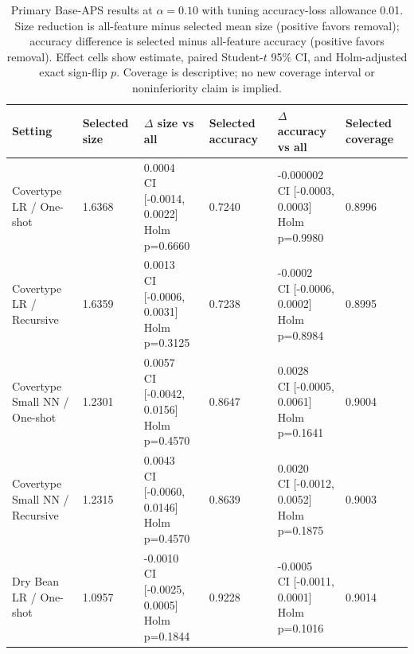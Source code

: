\begin{table}[t]
\centering
\caption{Primary Base-APS results at $\alpha=0.10$ with tuning accuracy-loss allowance 0.01. Size reduction is all-feature minus selected mean size (positive favors removal); accuracy difference is selected minus all-feature accuracy (positive favors removal). Effect cells show estimate, paired Student-$t$ 95\% CI, and Holm-adjusted exact sign-flip $p$. Coverage is descriptive; no new coverage interval or noninferiority claim is implied.}
\label{tab:t2-primary-compact}
\scriptsize
\begin{tabular}{llllll}
\hline
Setting & Selected size & $\Delta$ size vs all & Selected accuracy & $\Delta$ accuracy vs all & Selected coverage \\
\hline
\shortstack{Covertype\\LR / One-shot} & 1.6368 & \shortstack{0.0004\\CI [-0.0014, 0.0022]\\Holm p=0.6660} & 0.7240 & \shortstack{-0.000002\\CI [-0.0003, 0.0003]\\Holm p=0.9980} & 0.8996 \\
\shortstack{Covertype\\LR / Recursive} & 1.6359 & \shortstack{0.0013\\CI [-0.0006, 0.0031]\\Holm p=0.3125} & 0.7238 & \shortstack{-0.0002\\CI [-0.0006, 0.0002]\\Holm p=0.8984} & 0.8995 \\
\shortstack{Covertype\\Small NN / One-shot} & 1.2301 & \shortstack{0.0057\\CI [-0.0042, 0.0156]\\Holm p=0.4570} & 0.8647 & \shortstack{0.0028\\CI [-0.0005, 0.0061]\\Holm p=0.1641} & 0.9004 \\
\shortstack{Covertype\\Small NN / Recursive} & 1.2315 & \shortstack{0.0043\\CI [-0.0060, 0.0146]\\Holm p=0.4570} & 0.8639 & \shortstack{0.0020\\CI [-0.0012, 0.0052]\\Holm p=0.1875} & 0.9003 \\
\shortstack{Dry Bean\\LR / One-shot} & 1.0957 & \shortstack{-0.0010\\CI [-0.0025, 0.0005]\\Holm p=0.1844} & 0.9228 & \shortstack{-0.0005\\CI [-0.0011, 0.0001]\\Holm p=0.1016} & 0.9014 \\

\end{tabular}
\end{table}
